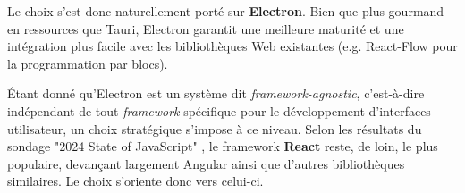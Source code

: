 Le choix s’est donc naturellement porté sur \textbf{Electron}.
Bien que plus gourmand en ressources que Tauri, Electron garantit une meilleure maturité et une intégration plus facile avec les bibliothèques Web existantes (e.g. React-Flow pour la programmation par blocs).

Étant donné qu’Electron est un système dit \textit{framework-agnostic}, c’est-à-dire indépendant de tout \textit{framework} spécifique pour le développement d’interfaces utilisateur, un choix stratégique s’impose à ce niveau.
Selon les résultats du sondage "2024 State of JavaScript" \autocite{noauthor_state_nodate-1}, le framework \textbf{React} reste, de loin, le plus populaire, devançant largement Angular ainsi que d’autres bibliothèques similaires.
Le choix s’oriente donc vers celui-ci.
